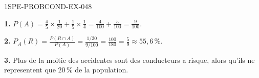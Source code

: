 \begin{corrige}{1SPE-PROBCOND-EX-048}

\textbf{1.} $P(A) = \frac{4}{5}\times\frac{1}{20}+\frac{1}{5}\times\frac{1}{4} = \frac{4}{100}+\frac{5}{100} = \frac{9}{100}$.

\textbf{2.} $P_A(R) = \frac{P(R \cap A)}{P(A)} = \frac{1/20}{9/100} = \frac{100}{180} = \frac{5}{9} \approx 55{,}6\,\%$.

\textbf{3.} Plus de la moitie des accidentes sont des conducteurs a risque, alors qu'ils ne representent que $20\,\%$ de la population.

\end{corrige}
